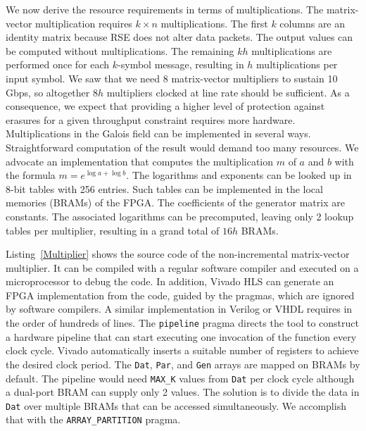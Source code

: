 We now derive the resource requirements in terms of multiplications.
The matrix-vector multiplication requires $k \times n$
multiplications. 
The first $k$ columns are an identity matrix because RSE does not alter data
packets.  The output values can be computed without multiplications.  The
remaining $kh$ multiplications are performed once for each $k$-symbol message,
resulting in $h$ multiplications per input symbol.  We saw that we need 8
matrix-vector multipliers to sustain 10 Gbps, so altogether $8h$ multipliers
clocked at line rate should be sufficient.  As a consequence, we expect that
providing a higher level of protection against erasures for a given throughput
constraint requires more hardware.  Multiplications in the Galois field can be
implemented in several ways.  Straightforward computation of the result would
demand too many resources.  We advocate an implementation that computes the
multiplication $m$ of $a$ and $b$ with the formula $m = e^{\log a + \log b}$.
The logarithms and exponents can be looked up in 8-bit tables with 256
entries.
Such tables can be implemented in the local memories (BRAMs) of the FPGA.  
The coefficients of the generator matrix are constants.  The associated
logarithms can be precomputed, leaving only 2 lookup tables per multiplier,
resulting in a grand total of $16h$ BRAMs.

Listing~\ref{Multiplier} shows the source code of the non-incremental
matrix-vector multiplier. 
It can be compiled with a regular software
compiler and executed on a microprocessor
to debug the code.
In addition, Vivado HLS can generate an FPGA implementation
from the code, guided by the pragmas, which are ignored by software compilers.
A similar implementation in Verilog or VHDL requires in the order of hundreds
of lines.  The {\tt pipeline} pragma directs the tool to construct a
hardware pipeline that can start executing one invocation of the function
every clock cycle.  Vivado automatically inserts a suitable number of registers
to achieve the desired clock period.
The {\tt Dat}, {\tt Par}, and {\tt Gen} arrays are mapped
on BRAMs by default.  The pipeline would need {\tt MAX\_K} values from {\tt Dat}
per clock cycle although a dual-port BRAM can supply only 2 values.  The
solution is to divide the data in {\tt Dat} over multiple BRAMs that can be
accessed simultaneously.  We accomplish that with the {\tt ARRAY\_PARTITION}
pragma.

